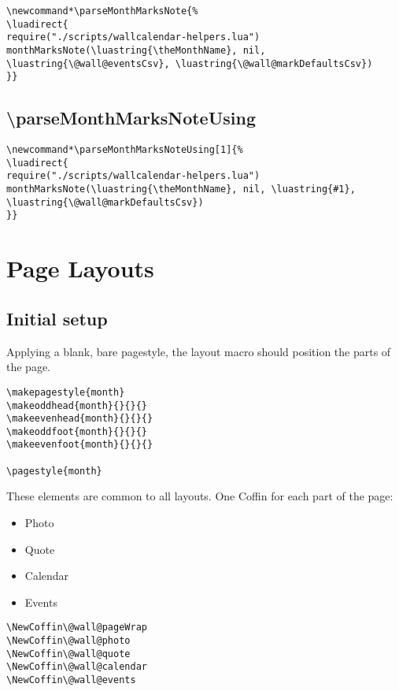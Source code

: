 \documentclass[11pt,oneside]{memoir-article}
\begin{document}
\begin{verbatim}
\newcommand*\parseMonthMarksNote{%
\luadirect{
require("./scripts/wallcalendar-helpers.lua")
monthMarksNote(\luastring{\theMonthName}, nil, \luastring{\@wall@eventsCsv}, \luastring{\@wall@markDefaultsCsv})
}}
\end{verbatim}

\section{\textbackslash parseMonthMarksNoteUsing}
\label{sec-9-13}

\begin{verbatim}
\newcommand*\parseMonthMarksNoteUsing[1]{%
\luadirect{
require("./scripts/wallcalendar-helpers.lua")
monthMarksNote(\luastring{\theMonthName}, nil, \luastring{#1}, \luastring{\@wall@markDefaultsCsv})
}}
\end{verbatim}

\chapter{Page Layouts}
\label{sec-10}
\section{Initial setup}
\label{sec-10-1}

Applying a blank, bare pagestyle, the layout macro should position the parts of
the page.

\begin{verbatim}
\makepagestyle{month}
\makeoddhead{month}{}{}{}
\makeevenhead{month}{}{}{}
\makeoddfoot{month}{}{}{}
\makeevenfoot{month}{}{}{}

\pagestyle{month}
\end{verbatim}

These elements are common to all layouts. One Coffin for each part of the
page:

\begin{itemize}
\item Photo
\item Quote
\item Calendar
\item Events
\end{itemize}

\begin{verbatim}
\NewCoffin\@wall@pageWrap
\NewCoffin\@wall@photo
\NewCoffin\@wall@quote
\NewCoffin\@wall@calendar
\NewCoffin\@wall@events
\end{verbatim}
\end{document}
